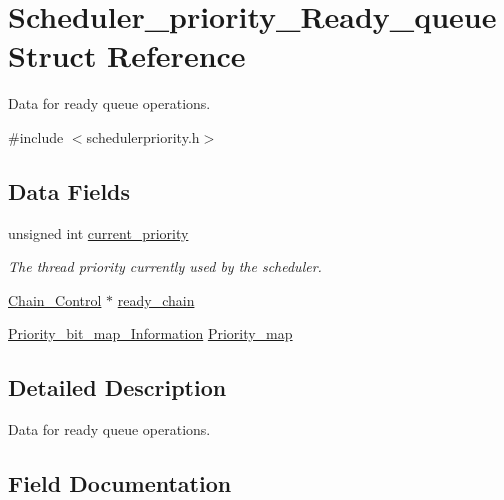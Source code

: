 \hypertarget{structScheduler__priority__Ready__queue}{}\section{Scheduler\+\_\+priority\+\_\+\+Ready\+\_\+queue Struct Reference}
\label{structScheduler__priority__Ready__queue}


Data for ready queue operations.  




{\ttfamily \#include $<$schedulerpriority.\+h$>$}

\subsection*{Data Fields}
\begin{DoxyCompactItemize}
\item 
\mbox{\label{structScheduler__priority__Ready__queue_a0c0d36fafd9f9b4f1f32293f7979f4c8}} 
unsigned int \mbox{\hyperlink{structScheduler__priority__Ready__queue_a0c0d36fafd9f9b4f1f32293f7979f4c8}{current\+\_\+priority}}
\begin{DoxyCompactList}\small\item\em The thread priority currently used by the scheduler. \end{DoxyCompactList}\item 
\mbox{\hyperlink{unionChain__Control}{Chain\+\_\+\+Control}} $\ast$ \mbox{\hyperlink{structScheduler__priority__Ready__queue_a97778d923af23d1d05fd9963df8e8674}{ready\+\_\+chain}}
\item 
\mbox{\hyperlink{structPriority__bit__map__Information}{Priority\+\_\+bit\+\_\+map\+\_\+\+Information}} \mbox{\hyperlink{structScheduler__priority__Ready__queue_adb1f5ce88800da5ab0ab689021a712f8}{Priority\+\_\+map}}
\end{DoxyCompactItemize}


\subsection{Detailed Description}
Data for ready queue operations. 

\subsection{Field Documentation}
\mbox{\label{structScheduler__priority__Ready__queue_adb1f5ce88800da5ab0ab689021a712f8}} 
